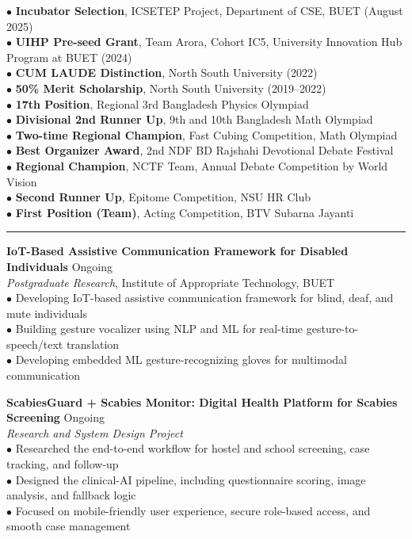 \documentclass[11pt,a4paper]{article}
\renewcommand{\section}[1]{%
    \par\vspace{10pt}%
    \pagebreak[0]%
    \noindent{\large\bfseries\scshape #1}%
    \vspace{2pt}%
    \hrule%
    \vspace{6pt}%
    \nopagebreak[4]%
}
\begin{document}
\noindent$\bullet$ \textbf{Incubator Selection}, ICSETEP Project, Department of CSE, BUET (August 2025)\\
$\bullet$ \textbf{UIHP Pre-seed Grant}, Team Arora, Cohort IC5, University Innovation Hub Program at BUET (2024)\\
$\bullet$ \textbf{CUM LAUDE Distinction}, North South University (2022)\\
$\bullet$ \textbf{50\% Merit Scholarship}, North South University (2019--2022)\\
$\bullet$ \textbf{17th Position}, Regional 3rd Bangladesh Physics Olympiad\\
$\bullet$ \textbf{Divisional 2nd Runner Up}, 9th and 10th Bangladesh Math Olympiad\\
$\bullet$ \textbf{Two-time Regional Champion}, Fast Cubing Competition, Math Olympiad\\
$\bullet$ \textbf{Best Organizer Award}, 2nd NDF BD Rajshahi Devotional Debate Festival\\
$\bullet$ \textbf{Regional Champion}, NCTF Team, Annual Debate Competition by World Vision\\
$\bullet$ \textbf{Second Runner Up}, Epitome Competition, NSU HR Club\\
$\bullet$ \textbf{First Position (Team)}, Acting Competition, BTV Subarna Jayanti

\section{Research Experience}

\noindent\textbf{IoT-Based Assistive Communication Framework for Disabled Individuals} \hfill Ongoing\\
\textit{Postgraduate Research}, Institute of Appropriate Technology, BUET\\
$\bullet$ Developing IoT-based assistive communication framework for blind, deaf, and mute individuals\\
$\bullet$ Building gesture vocalizer using NLP and ML for real-time gesture-to-speech/text translation\\
$\bullet$ Developing embedded ML gesture-recognizing gloves for multimodal communication

\vspace{6pt}
\noindent\textbf{ScabiesGuard + Scabies Monitor: Digital Health Platform for Scabies Screening} \hfill Ongoing\\
\textit{Research and System Design Project}\\
$\bullet$ Researched the end-to-end workflow for hostel and school screening, case tracking, and follow-up\\
$\bullet$ Designed the clinical-AI pipeline, including questionnaire scoring, image analysis, and fallback logic\\
$\bullet$ Focused on mobile-friendly user experience, secure role-based access, and smooth case management
\end{document}
